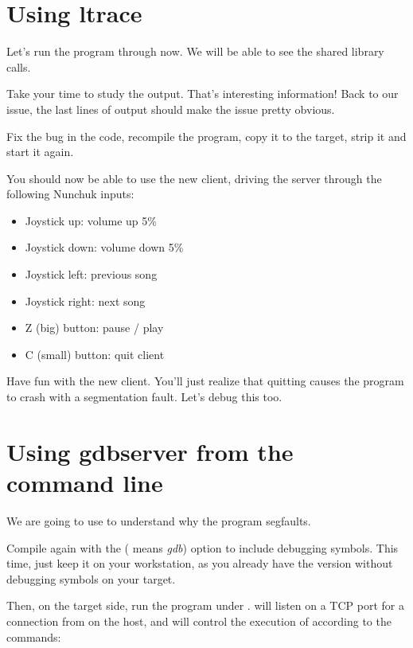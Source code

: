 \section{Using ltrace}

Let's run the program through  now. We will be able to see
the shared library calls.

Take your time to study the  output. That's interesting
information! Back to our issue, the last lines of output should make the
issue pretty obvious.

Fix the bug in the code, recompile the program, copy it to
the target, strip it and start it again.

You should now be able to use the new client, driving the server
through the following Nunchuk inputs:

\begin{itemize}
   \item Joystick up: volume up 5\%
   \item Joystick down: volume down 5\%
   \item Joystick left: previous song
   \item Joystick right: next song
   \item Z (big) button: pause / play
   \item C (small) button: quit client
\end{itemize}

Have fun with the new client. You'll just realize that quitting
causes the program to crash with a segmentation fault. Let's debug this
too.

\section{Using gdbserver from the command line}

We are going to use  to understand why the program
segfaults.

Compile  again with the  (
means {\em gdb}) option to include debugging symbols. This time, just
keep it on your workstation, as you already have the version without
debugging symbols on your target.

Then, on the target side, run the program under .
 will listen on a TCP port for a connection from
 on the host, and will control the execution of
 according to the  commands:


